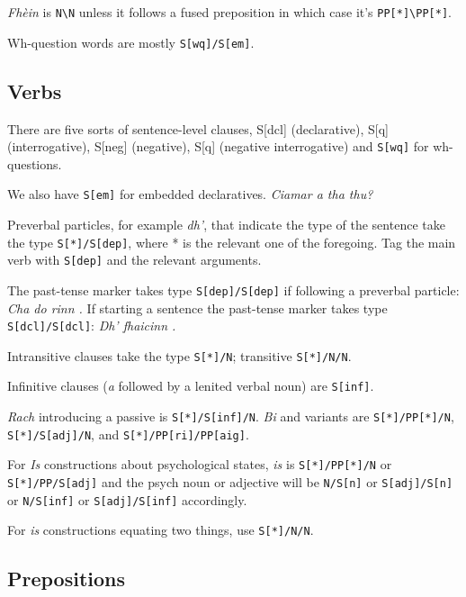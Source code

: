\documentclass[a4paper]{article}
\begin{document}
 \textit{Fh\`ein} is \texttt{N\textbackslash N} unless it follows a fused preposition in which case it's \texttt{PP[*]\textbackslash PP[*]}.

 Wh-question words are mostly \texttt{S[wq]/S[em]}.

\subsection{Verbs}

 There are five sorts of sentence-level clauses, S[dcl] (declarative), S[q] (interrogative), S[neg] (negative), S[q] (negative interrogative) and \texttt{S[wq]} for wh-questions.

 We also have \texttt{S[em]} for embedded declaratives. \textit{Ciamar a tha thu?}

 Preverbal particles, for example \textit{dh'}, that indicate the type of the sentence take the type \texttt{S[*]/S[dep]}, where * is the relevant one of the foregoing. Tag the main verb with \texttt{S[dep]} and the relevant arguments.

 The past-tense marker takes type \texttt{S[dep]/S[dep]} if following a preverbal particle: \textit{Cha do rinn .}
If starting a sentence the past-tense marker takes type \texttt{S[dcl]/S[dcl]}: \textit{Dh' fhaicinn .}

 Intransitive clauses take the type \texttt{S[*]/N}; transitive \texttt{S[*]/N/N}.

 Infinitive clauses (\textit{a} followed by a lenited verbal noun) are \texttt{S[inf]}.

 \textit{Rach} introducing a passive is \texttt{S[*]/S[inf]/N}.
 \textit{Bi} and variants are \texttt{S[*]/PP[*]/N}, \texttt{S[*]/S[adj]/N}, and \texttt{S[*]/PP[ri]/PP[aig]}.

 For \textit{Is} constructions about psychological states, \textit{is} is \texttt{S[*]/PP[*]/N} or \texttt{S[*]/PP/S[adj]} and the psych noun or adjective will be \texttt{N/S[n]} or \texttt{S[adj]/S[n]} or \texttt{N/S[inf]} or \texttt{S[adj]/S[inf]} accordingly.

 For \textit{is} constructions equating two things, use \texttt{S[*]/N/N}. 

\subsection{Prepositions}
\end{document}
